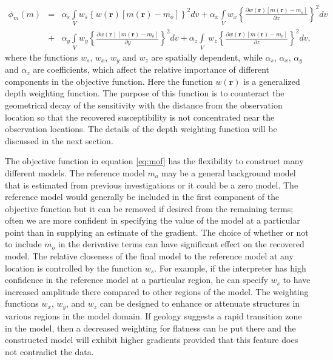 \begin{eqnarray}
\label{eq:mof}
\phi_m(m) &=& \alpha_s\int\limits_V w_s\left\{w(\mathbf{r})[m(\mathbf{r})-{m}_o] \right\}^2dv + \alpha_x\int\limits_V w_x \left\{\frac{\partial w(\mathbf{r})[m(\mathbf{r})-{m}_o]}{\partial x}\right\}^2dv \\ \nonumber
&+& \alpha_y\int\limits_V w_y\left\{\frac{\partial w(\mathbf{r})[m(\mathbf{r})-{m}_o]}{\partial y}\right\}^2dv +\alpha_z\int\limits_V\ w_z\left\{\frac{\partial w(\mathbf{r})[m(\mathbf{r})-{m}_o]}{\partial z}\right\}^2dv,
\end{eqnarray}
%
where the functions $w_s$, $w_x$, $w_y$ and $w_z$ are spatially dependent, while $\alpha_s$, $\alpha_x$, $\alpha_y$ and $\alpha_z$ are coefficients, which affect the relative importance of different components in the objective function. Here the function $w(\mathbf{r})$ is a generalized depth weighting function. The purpose of this function is to counteract the geometrical decay of the sensitivity with the distance from the observation location so that the recovered susceptibility is not concentrated near the observation locations. The details of the depth weighting function will be discussed in the next section.

The objective function in equation \ref{eq:mof} has the flexibility to construct many different models. The reference model $m_o$ may be a general background model that is estimated from previous investigations or it could be a zero model. The reference model would generally be included in the first component of the objective function but it can be removed if desired from the remaining terms; often we are more confident in specifying the value of the model at a particular point than in supplying an estimate of the gradient. The choice of whether or not to include $m_o$ in the derivative terms can have significant effect on the recovered model. The relative closeness of the final model to the reference model at any location is controlled by the function $w_s$. For example, if the interpreter has high confidence in the reference model at a particular region, he can specify $w_s$ to have increased amplitude there compared to other regions of the model. The weighting functions $w_x$, $w_y$, and $w_z$ can be designed to enhance or attenuate structures in various regions in the model domain. If geology suggests a rapid transition zone in the model, then a decreased weighting for flatness can be put there and the constructed model will exhibit higher gradients provided that this feature does not contradict the data.

